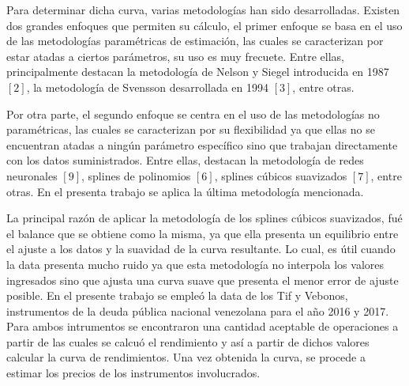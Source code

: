 \hspace{0.4cm} Para determinar dicha curva, varias metodolog\'ias han sido desarrolladas. Existen dos grandes enfoques que permiten su c\'alculo, el primer enfoque se basa en el uso de las metodolog\'ias param\'etricas de estimaci\'on, las cuales se caracterizan por estar atadas a ciertos par\'ametros, su uso es muy frecuete. Entre ellas, principalmente destacan la metodolog\'ia de Nelson y Siegel introducida en 1987 $[2]$, la metodolog\'ia de Svensson desarrollada en 1994 $[3]$, entre otras.


\hspace{0.4cm}Por otra parte, el segundo enfoque se centra en el uso de las metodolog\'ias no param\'etricas, las cuales se caracterizan por su flexibilidad ya que ellas no se encuentran atadas a ning\'un par\'ametro espec\'ifico sino que trabajan directamente con los datos suministrados. Entre ellas, destacan la metodolog\'ia de redes neuronales $[9]$, splines de polinomios $[6]$, splines c\'ubicos suavizados $[7]$, entre otras. En el presenta trabajo se aplica la \'ultima metodolog\'ia mencionada.


\hspace{0.4cm} La principal raz\'on de aplicar la metodolog\'ia de los splines c\'ubicos suavizados, fu\'e el balance que se obtiene como la misma, ya que ella presenta un equilibrio entre el ajuste a los datos y la suavidad de la curva resultante. Lo cual, es \'util cuando la data presenta mucho ruido ya que esta metodolog\'ia no interpola los valores ingresados sino que ajusta una curva suave que presenta el menor error de ajuste posible. En el presente trabajo se emple\'o la data de los Tif y Vebonos, instrumentos de la deuda p\'ublica nacional venezolana para el a\~no 2016 y 2017. Para ambos intrumentos se encontraron una cantidad aceptable de operaciones a partir de las cuales se calcu\'o el rendimiento y as\'i a partir de dichos valores calcular la curva de rendimientos. Una vez obtenida la curva, se procede a estimar los precios de los instrumentos involucrados.

